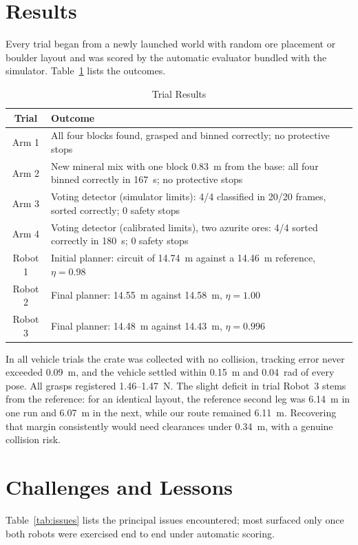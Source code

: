\documentclass[conference]{IEEEtran}
\begin{document}
\section{Results}
Every trial began from a newly launched world with random ore placement or boulder layout and was scored by the automatic evaluator bundled with the simulator. Table~\ref{tab:results} lists the outcomes.

\begin{table}[htbp]
\caption{Trial Results}
\begin{center}
\begin{tabular}{|c|p{6.4cm}|}
\hline
\textbf{Trial} & \textbf{Outcome} \\
\hline
Arm 1 & All four blocks found, grasped and binned correctly; no protective stops \\
\hline
Arm 2 & New mineral mix with one block 0.83~m from the base: all four binned correctly in 167~s; no protective stops \\
\hline
Arm 3 & Voting detector (simulator limits): 4/4 classified in 20/20 frames, sorted correctly; 0 safety stops \\
\hline
Arm 4 & Voting detector (calibrated limits), two azurite ores: 4/4 sorted correctly in 180~s; 0 safety stops \\
\hline
Robot 1 & Initial planner: circuit of 14.74~m against a 14.46~m reference, $\eta=0.98$ \\
\hline
Robot 2 & Final planner: 14.55~m against 14.58~m, $\eta=1.00$ \\
\hline
Robot 3 & Final planner: 14.48~m against 14.43~m, $\eta=0.996$ \\
\hline
\end{tabular}
\label{tab:results}
\end{center}
\end{table}

In all vehicle trials the crate was collected with no collision, tracking error never exceeded 0.09~m, and the vehicle settled within 0.15~m and 0.04~rad of every pose. All grasps registered 1.46--1.47~N. The slight deficit in trial Robot~3 stems from the reference: for an identical layout, the reference second leg was 6.14~m in one run and 6.07~m in the next, while our route remained 6.11~m. Recovering that margin consistently would need clearances under 0.34~m, with a genuine collision risk.

\section{Challenges and Lessons}
Table~\ref{tab:issues} lists the principal issues encountered; most surfaced only once both robots were exercised end to end under automatic scoring.
\end{document}
